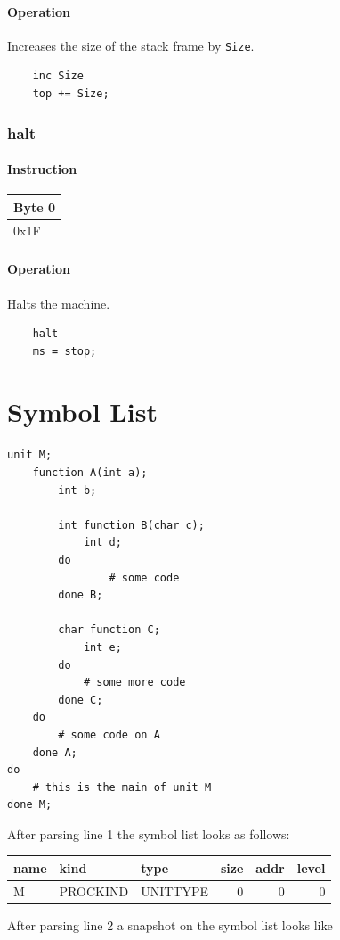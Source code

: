 \documentclass[11pt]{report}
\newcommand{\onebyteinstruction}[1]{
\begin{tabular}{|p{3.9em}|}
\hline
\tiny{Byte 0} \\ \hline
#1  \\ \hline
\end{tabular}
}
\begin{document}
\subsubsection{Operation}
Increases the size of the stack frame by \lstinline$Size$.

	\begin{lstlisting}
	inc Size
	top += Size;
	\end{lstlisting}

\subsection{halt}
\subsubsection{Instruction}
\onebyteinstruction{0x1F}

\subsubsection{Operation}
Halts the machine.

	\begin{lstlisting}
	halt
	ms = stop;
	\end{lstlisting}

\chapter{Symbol List}

\lstset{language=NoBeard,
	numbers=left,
	tabsize=2
}
\begin{lstlisting}
unit M;
	function A(int a);
		int b;
		
		int function B(char c);
			int d;
		do
				# some code
		done B;
		
		char function C;
			int e;
		do
			# some more code
		done C;
	do
		# some code on A
	done A;
do
	# this is the main of unit M
done M;
\end{lstlisting}

After parsing line 1 the symbol list looks as follows:

\begin{tabular}{lllrrr}
name & kind & type & size & addr & level \\
\hline
M & PROCKIND & UNITTYPE & 0 & 0 & 0
\end{tabular}

After parsing line 2 a snapshot on the symbol list looks like
\end{document}
